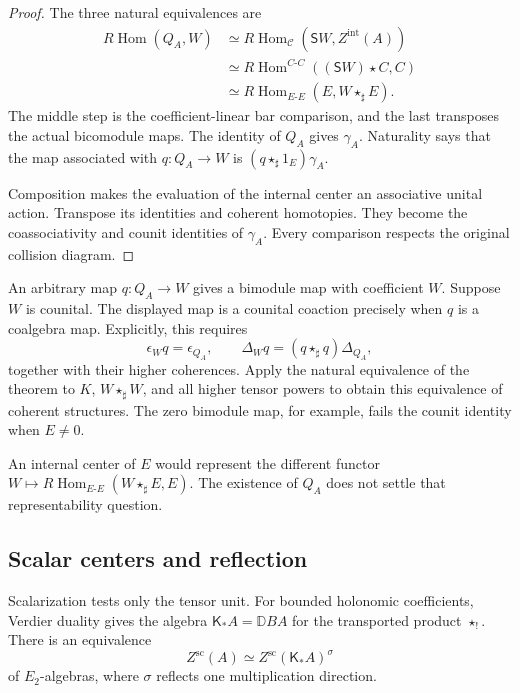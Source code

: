 \begin{proof}
The three natural equivalences are
\[
\begin{split}
 R\operatorname{Hom}(Q_A,W)
 &\simeq
 R\operatorname{Hom}_{\mathcal C}
       (\mathsf SW,Z^{\mathrm{int}}(A))\\
 &\simeq
 R\operatorname{Hom}^{C\text{-}C}
       ((\mathsf SW)\star C,C)\\
 &\simeq
 R\operatorname{Hom}_{E\text{-}E}
       (E,W\star_\sharp E).
\end{split}
\]
The middle step is the coefficient-linear
bar comparison, and the last transposes
the actual bicomodule maps.
The identity of $Q_A$ gives $\gamma_A$.
Naturality says that the map associated
with $q:Q_A\to W$ is
$(q\star_\sharp1_E)\gamma_A$.

Composition makes the evaluation of the
internal center an associative unital
action. Transpose its identities and
coherent homotopies. They become the
coassociativity and counit identities
of $\gamma_A$. Every comparison respects
the original collision diagram.
\end{proof}

An arbitrary map $q:Q_A\to W$ gives a
bimodule map with coefficient $W$.
Suppose $W$ is counital. The displayed map is a counital coaction
precisely when $q$ is a coalgebra map. Explicitly, this requires
\[
 \epsilon_Wq=\epsilon_{Q_A},\qquad
 \Delta_Wq=(q\star_\sharp q)\Delta_{Q_A},
\]
together with their higher coherences.
Apply the natural equivalence of the theorem
to $K$, $W\star_\sharp W$, and all higher
tensor powers to obtain this equivalence
of coherent structures. The zero bimodule
map, for example, fails the counit identity
when $E\ne0$.

An internal center of $E$ would represent
the different functor
$W\mapsto R\operatorname{Hom}_{E\text{-}E}
(W\star_\sharp E,E)$.
The existence of $Q_A$ does not settle
that representability question.

\subsection{Scalar centers and reflection}
\label{v4-arith:centers:subsec:reflection}

Scalarization tests only the tensor unit.
For bounded holonomic coefficients,
Verdier duality gives the algebra
$\mathsf K_*A=\mathbb D BA$ for the
transported product $\star_!$.
There is an equivalence
\[
 Z^{\mathrm{sc}}(A)
 \simeq
 Z^{\mathrm{sc}}(\mathsf K_*A)^\sigma
\]
of $E_2$-algebras, where $\sigma$ reflects
one multiplication direction.

